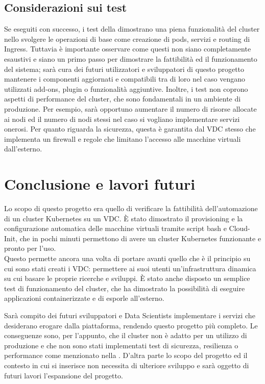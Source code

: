 \documentclass[12pt,a4paper,openright,twoside]{book}
\begin{document}
\section{Considerazioni sui test}
\label{sec:test-concl}
Se eseguiti con successo, i test della  dimostrano una piena funzionalità del cluster nello svolgere le operazioni di base come creazione di pods, servizi e routing di Ingress.
Tuttavia è importante osservare come questi non siano completamente esaustivi e siano un primo passo per dimostrare la fattibilità ed il funzionamento del sistema; sarà cura dei futuri utilizzatori e sviluppatori di questo progetto mantenere i componenti aggiornati e compatibili tra
di loro nel caso vengano utilizzati add-ons, plugin o funzionalità aggiuntive.
Inoltre, i test non coprono aspetti di performance del cluster, che sono fondamentali in un ambiente di produzione. Per esempio, sarà opportuno 
aumentare il numero di risorse allocate ai nodi ed il numero di nodi stessi nel caso si vogliano implementare servizi onerosi. 
Per quanto riguarda la sicurezza, questa è garantita dal VDC stesso che implementa un firewall e regole che limitano l'accesso alle macchine virtuali dall'esterno.
%
\chapter{Conclusione e lavori futuri}
Lo scopo di questo progetto era quello di verificare la fattibilità dell'automazione di un cluster Kubernetes su un VDC. 
È stato dimostrato il provisioning e la configurazione automatica delle macchine virtuali tramite script bash e Cloud-Init, che in pochi minuti permettono di 
avere un cluster Kubernetes funzionante e pronto per l'uso.\\
Questo permette ancora una volta di portare avanti quello che è il principio su cui sono stati creati i VDC: permettere ai suoi utenti un'infrastruttura dinamica
su cui basare le proprie ricerche e sviluppi.
È stato anche disposto un semplice test di funzionamento del cluster, che ha dimostrato la possibilità di eseguire applicazioni containerizzate e di esporle all'esterno.

Sarà compito dei futuri sviluppatori e Data Scientists implementare i servizi che desiderano erogare dalla piattaforma, rendendo questo progetto più completo.
Le conseguenze sono, per l'appunto, che il cluster non è adatto per un utilizzo di produzione e che non sono stati implementati test di sicurezza, resilienza o performance
come menzionato nella .
D'altra parte lo scopo del progetto ed il contesto in cui si inserisce non necessita di ulteriore sviluppo e sarà oggetto di futuri lavori l'espansione del progetto.
\end{document}
